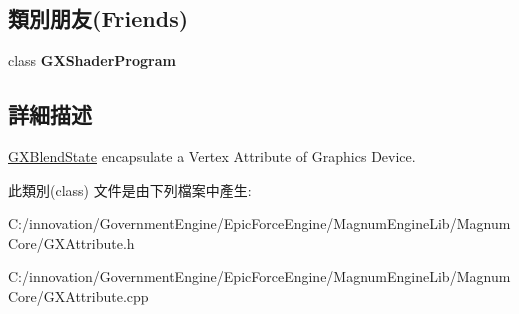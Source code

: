 \subsection*{類別朋友(Friends)}
\begin{DoxyCompactItemize}
\item 
class {\bfseries G\+X\+Shader\+Program}\hypertarget{class_i_dream_sky_1_1_g_x_attribute_a4a6e107978c21d22d7e96be0f48962d2}{}\label{class_i_dream_sky_1_1_g_x_attribute_a4a6e107978c21d22d7e96be0f48962d2}

\end{DoxyCompactItemize}


\subsection{詳細描述}
\hyperlink{class_i_dream_sky_1_1_g_x_blend_state}{G\+X\+Blend\+State} encapsulate a Vertex Attribute of Graphics Device. 

此類別(class) 文件是由下列檔案中產生\+:\begin{DoxyCompactItemize}
\item 
C\+:/innovation/\+Government\+Engine/\+Epic\+Force\+Engine/\+Magnum\+Engine\+Lib/\+Magnum\+Core/G\+X\+Attribute.\+h\item 
C\+:/innovation/\+Government\+Engine/\+Epic\+Force\+Engine/\+Magnum\+Engine\+Lib/\+Magnum\+Core/G\+X\+Attribute.\+cpp\end{DoxyCompactItemize}
